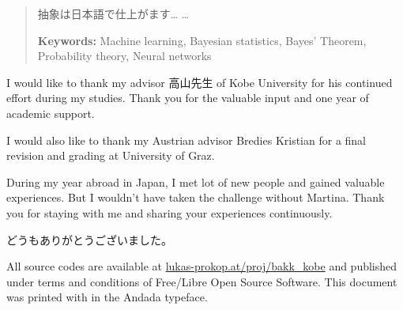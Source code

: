 \documentclass[a4paper,oneside]{book}
\theoremstyle{plain}
\begin{document}
\begin{abstract}%
  \parskip5pt
  抽象は日本語で仕上がます… \dots

  \vspace{3pt}
  \textbf{Keywords:}
    Machine learning, Bayesian statistics, Bayes' Theorem, Probability theory, Neural networks
\end{abstract}

\begin{acknowledgements}%
  \parskip5pt
  I would like to thank my advisor 高山先生 of Kobe University for his continued effort during my studies.
  Thank you for the valuable input and one year of academic support.

  I would also like to thank my Austrian advisor Bredies Kristian for a final revision and grading
  at University of Graz.

  During my year abroad in Japan, I met lot of new people and gained valuable experiences.
  But I wouldn't have taken the challenge without Martina. Thank you for staying with me
  and sharing your experiences continuously.

  どうもありがとうございました。
\end{acknowledgements}

All source codes are available at \href{http://lukas-prokop.at/proj/bakk\_kobe}{lukas-prokop.at/proj/bakk\_kobe}
and published under terms and conditions of Free/Libre Open Source Software.
This document was printed with \XeLaTeX{} in the Andada typeface.

\tableofcontents
\mainmatter





\backmatter
\printindex
\printbibliography
\end{document}
